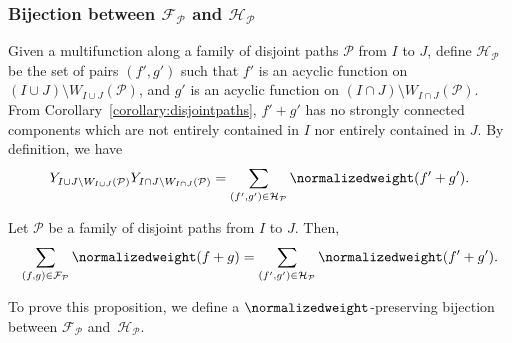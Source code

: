 \subsubsection{Bijection between \texorpdfstring{\(\mathcal{F}_{\mathcal{P}}\) and \(\mathcal{H}_{\mathcal{P}}\)}{FP and HP}}

Given a multifunction along a family of disjoint paths \(\mathcal{P}\) from \(I\) to \(J\),
define \(\mathcal{H}_{\mathcal{P}}\) be the set of pairs \((f', g')\) such that
\(f'\) is an acyclic function on \((I \cup J) \setminus W_{I \cup J}(\mathcal{P})\), and
\(g'\) is an acyclic function on \((I \cap J) \setminus W_{I \cap J}(\mathcal{P})\).
From Corollary~\ref{corollary:disjointpaths},
\(f' + g'\) has no strongly connected components which are not entirely contained in \(I\) nor entirely contained in \(J\).
By definition, we have
\begin{equation*}
    Y_{I \cup J \setminus W_{I \cup J}(\mathcal{P})} Y_{I \cap J \setminus W_{I \cap J}(\mathcal{P})}
    =
    \sum_{(f', g') \in \mathcal{H}_{\mathcal{P}}} \normalizedweight(f' + g').
\end{equation*}

\begin{prop} \label{proposition:nwt-fp-hp}
    Let \(\mathcal{P}\) be a family of disjoint paths from \(I\) to \(J\).
    Then,
    \begin{equation*}
    \sum_{(f,g) \in \mathcal{F}_{\mathcal{P}}} \normalizedweight(f+g)
    =
    \sum_{(f',g') \in \mathcal{H}_{\mathcal{P}}} \normalizedweight(f'+g').
    \end{equation*}
\end{prop}

To prove this proposition, we define a \(\normalizedweight\)-preserving bijection between \(\mathcal{F}_{\mathcal{P}}\) and~\(\mathcal{H}_{\mathcal{P}}\).

